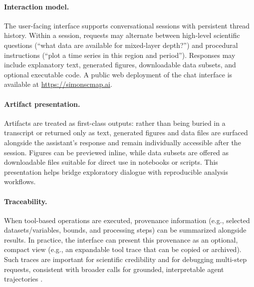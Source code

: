 \paragraph{Interaction model.}
The user-facing interface supports conversational sessions with persistent thread history.
Within a session, requests may alternate between high-level scientific questions (``what data are available for mixed-layer depth?'') and procedural instructions (``plot a time series in this region and period'').
Responses may include explanatory text, generated figures, downloadable data subsets, and optional executable code.
A public web deployment of the chat interface is available at \url{https://simonscmap.ai}.

\paragraph{Artifact presentation.}
Artifacts are treated as first-class outputs: rather than being buried in a transcript or returned only as text, generated figures and data files are surfaced alongside the assistant's response and remain individually accessible after the session.
Figures can be previewed inline, while data subsets are offered as downloadable files suitable for direct use in notebooks or scripts.
This presentation helps bridge exploratory dialogue with reproducible analysis workflows.

\paragraph{Traceability.}
When tool-based operations are executed, provenance information (e.g., selected datasets/variables, bounds, and processing steps) can be summarized alongside results.
In practice, the interface can present this provenance as an optional, compact view (e.g., an expandable tool trace that can be copied or archived).
Such traces are important for scientific credibility and for debugging multi-step requests, consistent with broader calls for grounded, interpretable agent trajectories \citep{Yao2022ReAct}.
